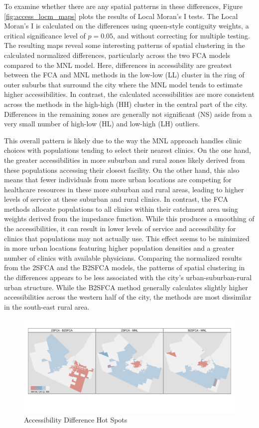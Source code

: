 \documentclass[]{elsarticle} %
\begin{document}
To examine whether there are any spatial patterns in these differences,
Figure \ref{fig:access_locm_maps} plots the results of Local Moran's I
tests. The Local Moran's I is calculated on the differences using
queen-style contiguity weights, a critical significance level of
\(p=0.05\), and without correcting for multiple testing. The resulting
maps reveal some interesting patterns of spatial clustering in the
calculated normalized differences, particularly across the two FCA
models compared to the MNL model. Here, differences in accessibility are
greatest between the FCA and MNL methods in the low-low (LL) cluster in
the ring of outer suburbs that surround the city where the MNL model
tends to estimate higher accessibilities. In contrast, the calculated
accessibilities are more consistent across the methods in the high-high
(HH) cluster in the central part of the city. Differences in the
remaining zones are generally not significant (NS) aside from a very
small number of high-low (HL) and low-high (LH) outliers.

This overall pattern is likely due to the way the MNL approach handles
clinic choices with populations tending to select their nearest clinics.
On the one hand, the greater accessibilities in more suburban and rural
zones likely derived from these populations accessing their closest
facility. On the other hand, this also means that fewer individuals from
more urban locations are competing for healthcare resources in these
more suburban and rural areas, leading to higher levels of service at
these suburban and rural clinics. In contrast, the FCA methods allocate
populations to all clinics within their catchment area using weights
derived from the impedance function. While this produces a smoothing of
the accessibilities, it can result in lower levels of service and
accessibility for clinics that populations may not actually use. This
effect seems to be minimized in more urban locations featuring higher
population densities and a greater number of clinics with available
physicians. Comparing the normalized results from the 2SFCA and the
B2SFCA models, the patterns of spatial clustering in the differences
appears to be less associated with the city's urban-suburban-rural urban
structure. While the B2SFCA method generally calculates slightly higher
accessibilities across the western half of the city, the methods are
most dissimilar in the south-east rural area.

\begin{figure}
\includegraphics[width=1\linewidth]{./img/access_locm_maps} \caption{\label{fig:access_locm_maps}Accessibility Difference Hot Spots}\label{fig:fig 4}
\end{figure}
\end{document}
